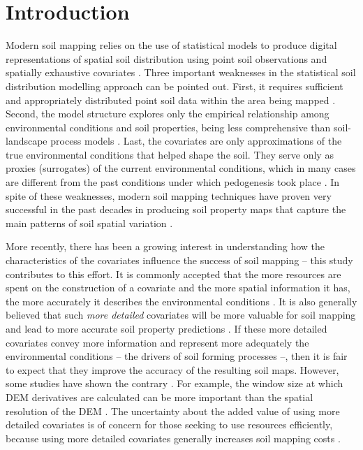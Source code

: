 \formatchapter

\section{Introduction}
\label{sec:chap05-intro}

Modern soil mapping relies on the use of statistical models to produce digital representations of spatial 
soil distribution using point soil observations and spatially exhaustive covariates \cite{McBratneyEtAl2003, 
ScullEtAl2003, Florinsky2012}. Three important weaknesses in the statistical soil distribution modelling 
approach can be pointed out. First, it requires sufficient and appropriately distributed point soil data within 
the area being mapped \cite{CarreEtAl2007a}. Second, the model structure explores only the empirical 
relationship among environmental conditions and soil properties, being less comprehensive than soil-landscape 
process models \cite{Grunwald2009}. Last, the covariates are only approximations of the true environmental 
conditions that helped shape the soil. They serve only as proxies (surrogates) of the current environmental 
conditions, which in many cases are different from the past conditions under which pedogenesis took place 
\cite{HeuvelinkEtAl2001}. In spite of these weaknesses, modern soil mapping techniques have proven very 
successful in the past decades in producing soil property maps that capture the main patterns of soil spatial 
variation \cite{MooreEtAl1993, McBratneyEtAl2000, Grunwald2009}.

More recently, there has been a growing interest in understanding how the characteristics of the covariates 
influence the success of soil mapping -- this study contributes to this effort. It is commonly accepted that 
the more resources are spent on the construction of a covariate and the more spatial information it has, the 
more accurately it describes the environmental conditions \cite{HupyEtAl2004, HenglEtAl2013a}. It is also 
generally believed that such \emph{more detailed} covariates will be more valuable for soil mapping and lead to 
more accurate soil property predictions \cite{CavazziEtAl2013, MaynardEtAl2014}. If these more detailed 
covariates convey more information and represent more adequately the environmental conditions -- the drivers of 
soil forming processes --, then it is fair to expect that they improve the accuracy of the resulting soil maps. 
However, some studies have shown the contrary \cite{ThompsonEtAl2001, EldeiryEtAl2008, KimEtAl2014}. For 
example, the window size at which DEM derivatives are calculated can be more important than the spatial 
resolution of the DEM \cite{Wood1996, ZhuEtAl2008, BehrensEtAl2010a}. The uncertainty about the added value of 
using more detailed covariates is of concern for those seeking to use resources efficiently, because using more 
detailed covariates generally increases soil mapping costs \cite{ShiEtAl2012}.

